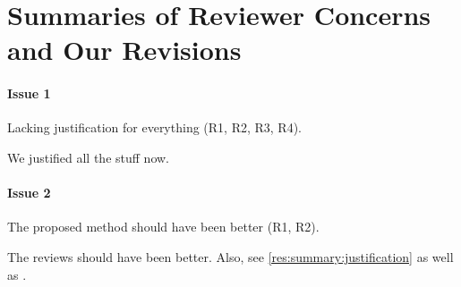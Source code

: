
\section{Summaries of Reviewer Concerns and Our Revisions} \label{sec:summary}

\paragraph{Issue 1}
Lacking justification for everything (R1, R2, R3, R4). 

\begin{response} \label{res:summary:justification}
We justified all the stuff now.
\end{response}


\paragraph{Issue 2}
The proposed method should have been better (R1, R2).

\begin{response} \label{res:summary:better}
The reviews should have been better. Also, see \autoref{res:summary:justification} as well as .
\end{response}

